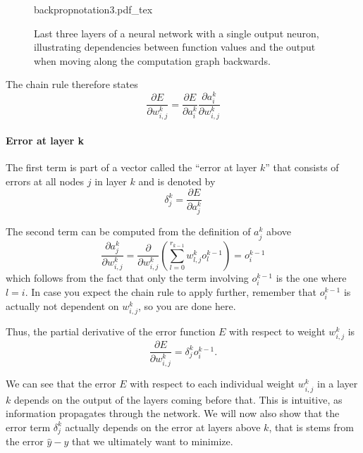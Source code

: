 \begin{figure}[htb]
    \centering
    \def\svgwidth{\textwidth}
    {backpropnotation3.pdf_tex}
    \caption{Last three layers of a neural network with a single output neuron, illustrating dependencies between function values and the output when moving along the computation graph backwards.\label{fig:backpropnotation3}}
\end{figure}

The chain rule therefore states
\begin{equation}
\frac{\partial E}{\partial w_{i,j}^k}=\frac{\partial E}{\partial a_i^k}\frac{\partial a_i^k}{\partial w_{i,j}^k}
\end{equation}

\paragraph{Error at layer k}
The first term is part of a vector called the ``error at layer $k$''  that consists of errors at all nodes $j$ in layer $k$ and is denoted by
\begin{equation}
\delta^k_j=\frac{\partial E}{\partial a_j^k}
\end{equation}

The second term can be computed from the definition of $a_j^k$ above
\begin{equation}
\frac{\partial a^k_j}{\partial w_{i,j}^k}=\frac{\partial}{\partial w_{i,j}^k}\left(\sum_{l=0}^{r_{k-1}} w_{l,j}^k o^{k-1}_l\right)=o^{k-1}_i
\end{equation}
which follows from the fact that only the term involving $o^{k-1}_i$ is the one where $l=i$. In case you expect the chain rule to apply further, remember that $o^{k-1}_i$ is actually not dependent on $w_{i,j}^k$, so you are done here.

Thus, the partial derivative of the error function $E$ with respect to weight $w_{i,j}^k$ is
\begin{equation}
\frac{\partial E}{\partial w^k_{i,j}}=\delta^k_jo^{k-1}_i.
\end{equation}

We can see that the error $E$ with respect to each individual weight $w_{i,j}^k$ in a layer $k$ depends on the output of the layers coming before that. This is intuitive, as information propagates through the network. We will now also show that the error term $\delta_j^k$ actually depends on the error at layers above $k$, that is stems from the error $\hat{y}-y$ that we ultimately want to minimize.

